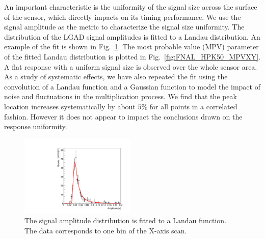 \documentclass[preprint,1p]{elsarticle}
\begin{document}
An important characteristic is the uniformity of the signal size
across the surface of the sensor, which directly impacts on its timing performance. We use the signal amplitude as the metric to characterize the signal
size uniformity. The distribution of the LGAD signal amplitudes is fitted to a
Landau distribution. An example of the fit is shown in Fig.~\ref{fig:ExampleLandauFit}.
The most probable value (MPV) parameter of the fitted
Landau distribution is plotted in Fig.~\ref{fig:FNAL_HPK50_MPVXY}. 
A flat response with a uniform signal size is observed over the whole sensor area.
As a study of systematic effects, we have also repeated the fit using the convolution 
of a Landau function and a Gaussian function to model the impact of noise and fluctuations
in the multiplication process. We find that the peak location increases 
systematically by about $5\%$ for all points in a correlated fashion. 
However it does not appear to impact the conclusions drawn on the response uniformity.

\begin{figure}[htbp] 
\centering
\includegraphics[width=0.49\textwidth]{figs/MPVFitExample_Landau.pdf} 
\caption{The signal amplitude distribution is fitted to a Landau function. 
The data corresponds to one bin of the X-axis scan.} 
\label{fig:ExampleLandauFit} 
\end{figure} 
\end{document}
